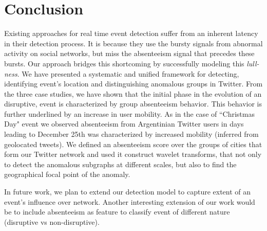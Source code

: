 \section{Conclusion} \label{sec:conclusion}
Existing approaches for real time event detection suffer from an inherent latency in their detection process. It is because they use the bursty signals from abnormal activity on social networks, but miss the absenteeism signal that precedes these bursts. Our approach bridges this shortcoming by successfully modeling this \textit{lull-ness}. We have presented a systematic and unified framework for detecting, identifying event's location and distinguishing anomalous groups in Twitter. From the three case studies, we have shown that the initial phase in the evolution of an disruptive, event is characterized by group absenteeism behavior. This behavior is further underlined by an increase in user mobility. As in the case of ``Christmas Day" event we observed absenteeism from Argentinian Twitter users in days leading to December 25th was characterized by increased mobility (inferred from geolocated tweets). We defined an absenteeism score over the groups of cities that form our Twitter network and used it construct wavelet transforms, that not only to detect the anomalous subgraphs at different scales, but also to find the geographical focal point of the anomaly.

In future work, we plan to extend our detection model to capture extent of an event's influence over network. Another interesting extension of our work would be to include absenteeism as feature to classify event of different nature (disruptive vs non-disruptive).
